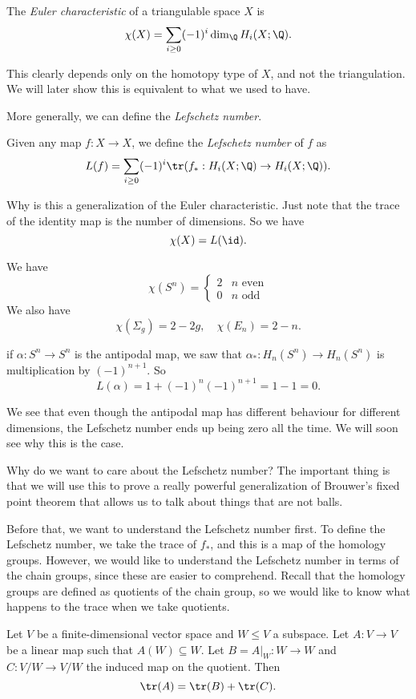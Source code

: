 \documentclass[a4paper]{article}
\begin{document}
\begin{defi}
  The \emph{Euler characteristic} of a triangulable space $X$ is
  \[
    \chi(X) = \sum_{i \geq 0} (-1)^i \dim_\Q H_i(X; \Q).
  \]
\end{defi}
This clearly depends only on the homotopy type of $X$, and not the triangulation. We will later show this is equivalent to what we used to have.

More generally, we can define the \emph{Lefschetz number}.
\begin{defi}
  Given any map $f: X \to X$, we define the \emph{Lefschetz number} of $f$ as
  \[
    L(f) = \sum_{i \geq 0} (-1)^i \tr(f_*: H_i(X; \Q) \to H_i(X; \Q)).
  \]
\end{defi}
Why is this a generalization of the Euler characteristic. Just note that the trace of the identity map is the number of dimensions. So we have
\[
  \chi(X) = L (\id).
\]
\begin{eg}
  We have
  \[
    \chi(S^n) =
    \begin{cases}
      2 & n\text{ even}\\
      0 & n\text{ odd}
    \end{cases}
  \]
  We also have
  \[
    \chi(\Sigma_g) = 2 - 2g,\quad \chi(E_n) = 2 - n.
  \]
\end{eg}

\begin{eg}
  if $\alpha: S^n \to S^n$ is the antipodal map, we saw that $\alpha_*: H_n(S^n) \to H_n(S^n)$ is multiplication by $(-1)^{n + 1}$. So
  \[
    L(\alpha) = 1 + (-1)^n (-1)^{n + 1} = 1 - 1 = 0.
  \]
\end{eg}
We see that even though the antipodal map has different behaviour for different dimensions, the Lefschetz number ends up being zero all the time. We will soon see why this is the case.

Why do we want to care about the Lefschetz number? The important thing is that we will use this to prove a really powerful generalization of Brouwer's fixed point theorem that allows us to talk about things that are not balls.

Before that, we want to understand the Lefschetz number first. To define the Lefschetz number, we take the trace of $f_*$, and this is a map of the homology groups. However, we would like to understand the Lefschetz number in terms of the chain groups, since these are easier to comprehend. Recall that the homology groups are defined as quotients of the chain group, so we would like to know what happens to the trace when we take quotients.
\begin{lemma}
  Let $V$ be a finite-dimensional vector space and $W \leq V$ a subspace. Let $A: V\to V$ be a linear map such that $A(W) \subseteq W$. Let $B = A|_W: W \to W$ and $C: V/W \to V/W$ the induced map on the quotient. Then
  \[
    \tr (A) = \tr(B) + \tr(C).
  \]
\end{lemma}
\end{document}
